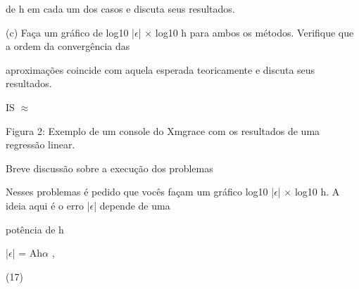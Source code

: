 \documentclass[a4paper,portrait,12pt]{article}
\begin{document}
\begin{flushleft}
de h em cada um dos casos e discuta seus resultados.
\end{flushleft}


\begin{flushleft}
(c) Fa\c{c}a um gr\'{a}fico de log10 |$\epsilon$| × log10 h para ambos os m\'{e}todos. Verifique que a ordem da converg\^{e}ncia das
\end{flushleft}


\begin{flushleft}
aproxima\c{c}\~{o}es coincide com aquela esperada teoricamente e discuta seus resultados.
\end{flushleft}


\begin{flushleft}
IS $\approx$
\end{flushleft}










\begin{flushleft}
Figura 2: Exemplo de um console do Xmgrace com os resultados de uma regress\~{a}o linear.
\end{flushleft}





\begin{flushleft}
Breve discuss\~{a}o sobre a execu\c{c}\~{a}o dos problemas
\end{flushleft}





\begin{flushleft}
Nesses problemas \'{e} pedido que voc\^{e}s fa\c{c}am um gr\'{a}fico log10 |$\epsilon$| × log10 h. A ideia aqui \'{e} o erro |$\epsilon$| depende de uma
\end{flushleft}


\begin{flushleft}
pot\^{e}ncia de h
\end{flushleft}


\begin{flushleft}
|$\epsilon$| = Ah$\alpha$ ,
\end{flushleft}





(17)
\end{document}
